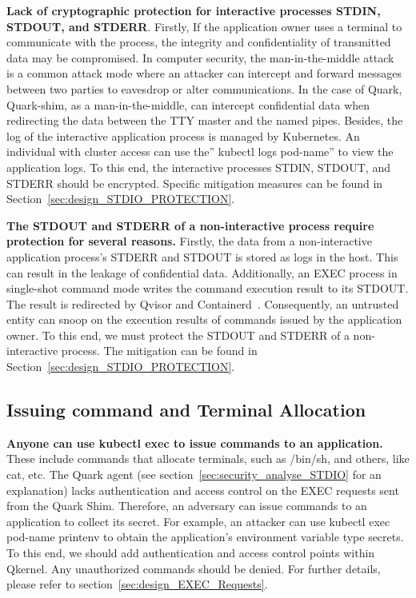 \textbf{Lack of cryptographic protection for interactive processes STDIN, STDOUT, and STDERR}. Firstly, If the application owner uses a terminal to communicate with the process, the integrity and confidentiality of transmitted data may be compromised. In computer security, the man-in-the-middle 
attack~\cite*{Man_in_the_middle_attack} is a common attack mode where an attacker can intercept and forward messages between two parties to eavesdrop or alter communications. In the case of Quark,  Quark-shim, as a man-in-the-middle, can intercept confidential data when redirecting the data between the TTY master and the named 
pipes. Besides, the log of the interactive application process is managed by Kubernetes. An individual with cluster access can use the” kubectl logs pod-name” to view the application logs. To this end, the interactive processes STDIN, STDOUT, and STDERR should be encrypted. Specific mitigation measures can be 
found in  Section~\ref{sec:design_STDIO_PROTECTION}.
 
 
\textbf{The STDOUT and STDERR of a non-interactive process require protection for several reasons.} Firstly, the data from a non-interactive application process’s STDERR and STDOUT is stored as logs in the host. This can result in the leakage of confidential data. Additionally, an EXEC process in 
single-shot command mode writes the command execution result to its STDOUT. The result is redirected by Qvisor and Containerd~\cite*{containerd}. Consequently, an untrusted entity can snoop on the execution results of commands issued by the application owner. To this end, we must protect the STDOUT and STDERR of a non-interactive process. The mitigation can be found in  Section~\ref{sec:design_STDIO_PROTECTION}.


\subsection{Issuing command and Terminal Allocation}
\textbf{Anyone can use kubectl exec to issue commands to an application.} These include commands that allocate terminals, such as /bin/sh, and others, like cat, etc. The Quark agent (see section~\ref{sec:security_analyse_STDIO} for an explanation) lacks authentication and access control on the EXEC requests sent from the Quark Shim. Therefore, an adversary can 
issue commands to an application to collect its secret. For example, an attacker can use kubectl exec pod-name printenv to obtain the application’s environment variable type secrets. To this end, we should add authentication and access control points within Qkernel. Any unauthorized commands should be denied. For further details, please refer to section~\ref{sec:design_EXEC_Requests}.


